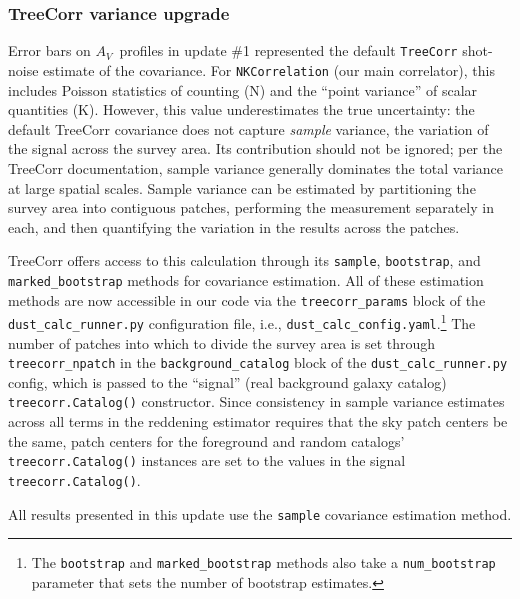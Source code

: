 \documentclass[11pt, oneside]{article}   	%
\newcommand{\av}{$A_V$~}
\begin{document}
\subsubsection{TreeCorr variance upgrade}

Error bars on \av profiles in update \#1 represented the default \texttt{TreeCorr} shot-noise estimate of the covariance. For \texttt{NKCorrelation} (our main correlator), this includes Poisson statistics of counting (N) and the ``point variance'' of scalar quantities (K). 
However, this value underestimates the true uncertainty: the default TreeCorr covariance does not capture \textit{sample} variance, the variation of the signal across the survey area. Its contribution should not be ignored; per the TreeCorr documentation, sample variance generally dominates the total variance at large spatial scales. Sample variance can be estimated by partitioning the survey area into contiguous patches, performing the measurement separately in each, and then quantifying the variation in the results across the patches.

TreeCorr offers access to this calculation through its \texttt{sample}, \texttt{bootstrap}, and \texttt{marked\_bootstrap} methods for covariance estimation.%
All of these estimation methods are now accessible in our code via the \texttt{treecorr\_params} block of the \texttt{dust\_calc\_runner.py} configuration file, i.e., \texttt{dust\_calc\_config.yaml}.\footnote{The \texttt{bootstrap} and \texttt{marked\_bootstrap} methods also take a \texttt{num\_bootstrap} parameter that sets the number of bootstrap estimates.} The number of patches into which to divide the survey area is set through \texttt{treecorr\_npatch} in the \texttt{background\_catalog} block of the \texttt{dust\_calc\_runner.py} config, which is passed to the ``signal'' (real background galaxy catalog) \texttt{treecorr.Catalog()} constructor. Since consistency in sample variance estimates across all terms in the reddening estimator requires that the sky patch centers be the same, patch centers for the foreground and random catalogs' \texttt{treecorr.Catalog()} instances are set to the values in the signal \texttt{treecorr.Catalog()}.

All results presented in this update use the \texttt{sample} covariance estimation method.
\end{document}
